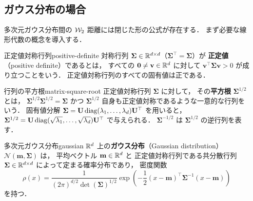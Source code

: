 \subsection{ガウス分布の場合}
\label{subsec:gaussian}

多次元ガウス分布間の $\mathcal{W}_2$ 距離には閉じた形の公式が存在する．
まず必要な線形代数の概念を導入する．

\begin{definition}{正定値対称行列}{positive-definite}
  対称行列 $\mathbf{\Sigma} \in \mathbb{R}^{d \times d}$（$\mathbf{\Sigma}^\top = \mathbf{\Sigma}$）が
  \textbf{正定値}（positive definite）であるとは，
  すべての $\mathbf{0} \neq \mathbf{v} \in \mathbb{R}^d$ に対して
  $\mathbf{v}^\top \mathbf{\Sigma} \mathbf{v} > 0$ が成り立つことをいう．
  正定値対称行列のすべての固有値は正である．
\end{definition}

\begin{definition}{行列の平方根}{matrix-square-root}
  正定値対称行列 $\mathbf{\Sigma}$ に対して，
  その\textbf{平方根} $\mathbf{\Sigma}^{1/2}$ とは，
  $\mathbf{\Sigma}^{1/2} \mathbf{\Sigma}^{1/2} = \mathbf{\Sigma}$ かつ
  $\mathbf{\Sigma}^{1/2}$ 自身も正定値対称であるような一意的な行列をいう．
  固有値分解 $\mathbf{\Sigma} = \mathbf{U} \operatorname{diag}(\lambda_1, \ldots, \lambda_d) \mathbf{U}^\top$
  を用いると，$\mathbf{\Sigma}^{1/2} = \mathbf{U} \operatorname{diag}(\sqrt{\lambda_1}, \ldots, \sqrt{\lambda_d}) \mathbf{U}^\top$ で与えられる．
  $\mathbf{\Sigma}^{-1/2}$ は $\mathbf{\Sigma}^{1/2}$ の逆行列を表す．
\end{definition}

\begin{definition}{多次元ガウス分布}{gaussian}
  $\mathbb{R}^d$ 上の\textbf{ガウス分布}（Gaussian distribution）
  $\mathcal{N}(\mathbf{m}, \mathbf{\Sigma})$ は，
  平均ベクトル $\mathbf{m} \in \mathbb{R}^d$ と
  正定値対称行列である共分散行列 $\mathbf{\Sigma} \in \mathbb{R}^{d \times d}$ によって定まる確率分布であり，
  密度関数
  \[
    \rho(x) = \frac{1}{(2\pi)^{d/2} \det(\mathbf{\Sigma})^{1/2}}
    \exp\!\left( -\frac{1}{2} (x - \mathbf{m})^\top \mathbf{\Sigma}^{-1} (x - \mathbf{m}) \right)
  \]
  を持つ．
\end{definition}

